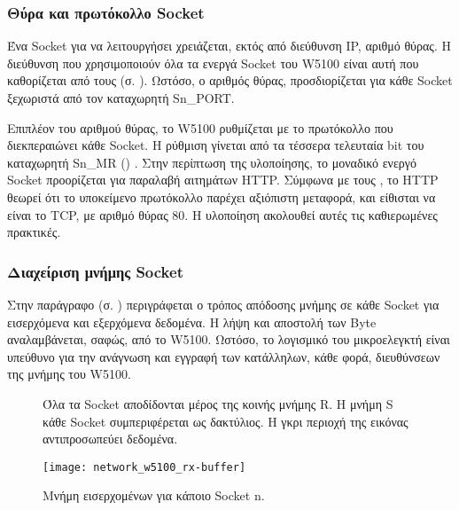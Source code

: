 \subsubsection{Θύρα και πρωτόκολλο Socket}
\label{ssubsec:network:port_mr}

Ένα Socket για να λειτουργήσει χρειάζεται, εκτός από διεύθυνση IP, αριθμό θύρας.
Η διεύθυνση που χρησιμοποιούν όλα τα ενεργά Socket του W5100 είναι αυτή που
καθορίζεται από τους
(σ. \pageref{ssubsec:network:addr-registers}).
Ωστόσο, ο αριθμός θύρας, προσδιορίζεται για κάθε Socket ξεχωριστά από τον
καταχωρητή Sn\_PORT.

Επιπλέον του αριθμού θύρας, το W5100 ρυθμίζεται με το πρωτόκολλο που
διεκπεραιώνει κάθε Socket. Η ρύθμιση γίνεται από τα τέσσερα τελευταία bit του
καταχωρητή Sn\_MR () \parencite[25--26]{wiz11:w5100}.
Στην περίπτωση της υλοποίησης, το μοναδικό ενεργό Socket προορίζεται για
παραλαβή αιτημάτων HTTP. Σύμφωνα με τους \textcite[13]{rfc2616}, το HTTP θεωρεί
ότι το υποκείμενο πρωτόκολλο παρέχει αξιόπιστη μεταφορά, και είθισται να είναι
το TCP, με αριθμό θύρας 80. Η υλοποίηση ακολουθεί αυτές τις καθιερωμένες
πρακτικές.


\subsubsection{Διαχείριση μνήμης Socket}
\label{ssubsec:network:rx-tx-buffer}

Στην παράγραφο
 (σ. \pageref{ssubsec:network:rmsr_tmsr})
περιγράφεται ο τρόπος απόδοσης μνήμης σε κάθε Socket για εισερχόμενα και
εξερχόμενα δεδομένα. Η λήψη και αποστολή των Byte αναλαμβάνεται, σαφώς, από το
W5100. Ωστόσο, το λογισμικό του μικροελεγκτή είναι υπεύθυνο για την ανάγνωση και
εγγραφή των κατάλληλων, κάθε φορά, διευθύνσεων της μνήμης του W5100.

\begin{figure}
    \caption{Μνήμη εισερχομένων για κάποιο Socket n.
    \label{fig:network:w5100-rx-buffer}}

    Όλα τα Socket αποδίδονται μέρος της κοινής μνήμης R. Η μνήμη
    S κάθε Socket συμπεριφέρεται ως δακτύλιος. Η γκρι περιοχή της
    εικόνας αντιπροσωπεύει δεδομένα.

    \begin{center}
    \texttt{[image: network\_w5100\_rx-buffer]}
    \end{center}
\end{figure}

